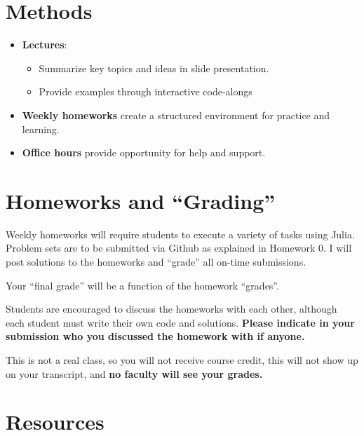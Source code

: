 \documentclass[
]{book}
\providecommand{\tightlist}{%
  \setlength{\itemsep}{0pt}\setlength{\parskip}{0pt}}
\begin{document}
\hypertarget{methods}{%
\section{Methods}\label{methods}}

\begin{itemize}
\tightlist
\item
  \textbf{Lectures}:

  \begin{itemize}
  \tightlist
  \item
    Summarize key topics and ideas in slide presentation.
  \item
    Provide examples through interactive code-alongs
  \end{itemize}
\item
  \textbf{Weekly homeworks} create a structured environment for practice and learning.
\item
  \textbf{Office hours} provide opportunity for help and support.
\end{itemize}

\hypertarget{homeworks-and-grading}{%
\section{Homeworks and ``Grading''}\label{homeworks-and-grading}}

Weekly homeworks will require students to execute a variety of tasks using Julia. Problem sets are to be submitted via Github as explained in Homework 0. I will post solutions to the homeworks and ``grade'' all on-time submissions.

Your ``final grade'' will be a function of the homework ``grades''.

Students are encouraged to discuss the homeworks with each other, although each student must write their own code and solutions. \textbf{Please indicate in your submission who you discussed the homework with if anyone.}

This is not a real class, so you will not receive course credit, this will not show up on your transcript, and \textbf{no faculty will see your grades.}

\hypertarget{resources}{%
\section{Resources}\label{resources}}
\end{document}
